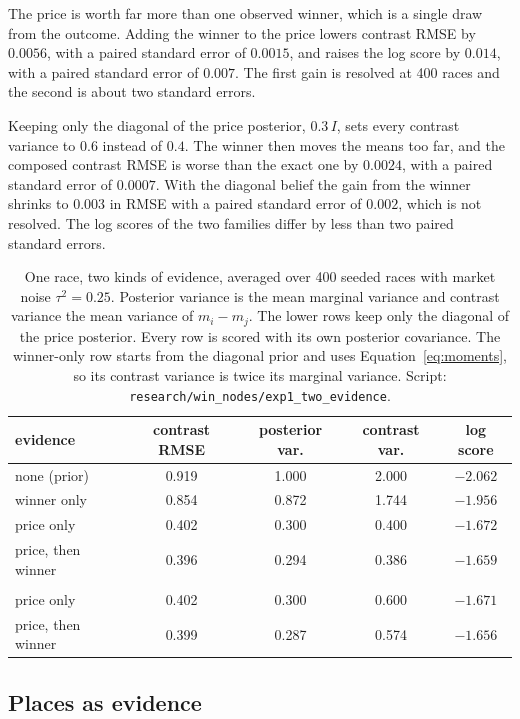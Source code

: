 \documentclass[11pt]{article}
\begin{document}
The price is worth far more than one observed winner, which is a
single draw from the outcome. Adding the winner to the price lowers
contrast RMSE by $0.0056$, with a paired standard error of $0.0015$,
and raises the log score by $0.014$, with a paired standard error of
$0.007$. The first gain is resolved at 400 races and the second is
about two standard errors.

Keeping only the diagonal of the price posterior, $0.3\,I$, sets every
contrast variance to $0.6$ instead of $0.4$. The winner then moves the
means too far, and the composed contrast RMSE is worse than the exact
one by $0.0024$, with a paired standard error of $0.0007$. With the
diagonal belief the gain from the winner shrinks to $0.003$ in RMSE
with a paired standard error of $0.002$, which is not resolved. The
log scores of the two families differ by less than two paired
standard errors.

\begin{table}[t]
\centering
\begin{tabular}{lcccc}
\toprule
evidence & contrast RMSE & posterior var. & contrast var. & log score \\
\midrule
none (prior) & 0.919 & 1.000 & 2.000 & $-2.062$ \\
winner only & 0.854 & 0.872 & 1.744 & $-1.956$ \\
price only & 0.402 & 0.300 & 0.400 & $-1.672$ \\
price, then winner & 0.396 & 0.294 & 0.386 & $-1.659$ \\
\addlinespace
\multicolumn{5}{l}{\emph{price posterior kept diagonal}}\\
price only & 0.402 & 0.300 & 0.600 & $-1.671$ \\
price, then winner & 0.399 & 0.287 & 0.574 & $-1.656$ \\
\bottomrule
\end{tabular}
\caption{One race, two kinds of evidence, averaged over 400 seeded
races with market noise $\tau^2=0.25$. Posterior variance is the
mean marginal variance and contrast variance the mean variance of
$m_i-m_j$. The lower rows keep only the diagonal of the price
posterior. Every row is scored with its own posterior covariance.
The winner-only row starts from the diagonal prior and uses
Equation~\eqref{eq:moments}, so its contrast variance is twice its
marginal variance.
Script: \texttt{research/win\_nodes/exp1\_two\_evidence}.}
\label{tab:price}
\end{table}

\subsection{Places as evidence}
\label{sec:places}
\end{document}
